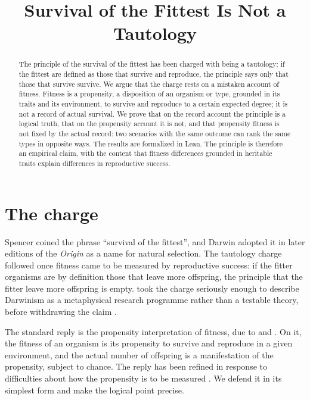 \documentclass{situationist-preprint}
\title{Survival of the Fittest Is Not a Tautology}
\begin{document}
\maketitle

\begin{abstract}
The principle of the survival of the fittest has been charged with being a tautology: if the fittest are defined as those that survive and reproduce, the principle says only that those that survive survive. We argue that the charge rests on a mistaken account of fitness. Fitness is a propensity, a disposition of an organism or type, grounded in its traits and its environment, to survive and reproduce to a certain expected degree; it is not a record of actual survival. We prove that on the record account the principle is a logical truth, that on the propensity account it is not, and that propensity fitness is not fixed by the actual record: two scenarios with the same outcome can rank the same types in opposite ways. The results are formalized in Lean. The principle is therefore an empirical claim, with the content that fitness differences grounded in heritable traits explain differences in reproductive success.
\end{abstract}

\section{The charge}

Spencer coined the phrase \enquote{survival of the fittest}, and Darwin adopted it in later editions of the \emph{Origin} as a name for natural selection. The tautology charge followed once fitness came to be measured by reproductive success: if the fitter organisms are by definition those that leave more offspring, the principle that the fitter leave more offspring is empty. \citet{Popper1976} took the charge seriously enough to describe Darwinism as a metaphysical research programme rather than a testable theory, before withdrawing the claim \citep{Popper1978}.

The standard reply is the propensity interpretation of fitness, due to \citet{Brandon1978} and \citet{MillsBeatty1979}. On it, the fitness of an organism is its propensity to survive and reproduce in a given environment, and the actual number of offspring is a manifestation of the propensity, subject to chance. The reply has been refined in response to difficulties about how the propensity is to be measured \citep{BeattyFinsen1989,Sober2001,PenceRamsey2013}. We defend it in its simplest form and make the logical point precise.
\end{document}
